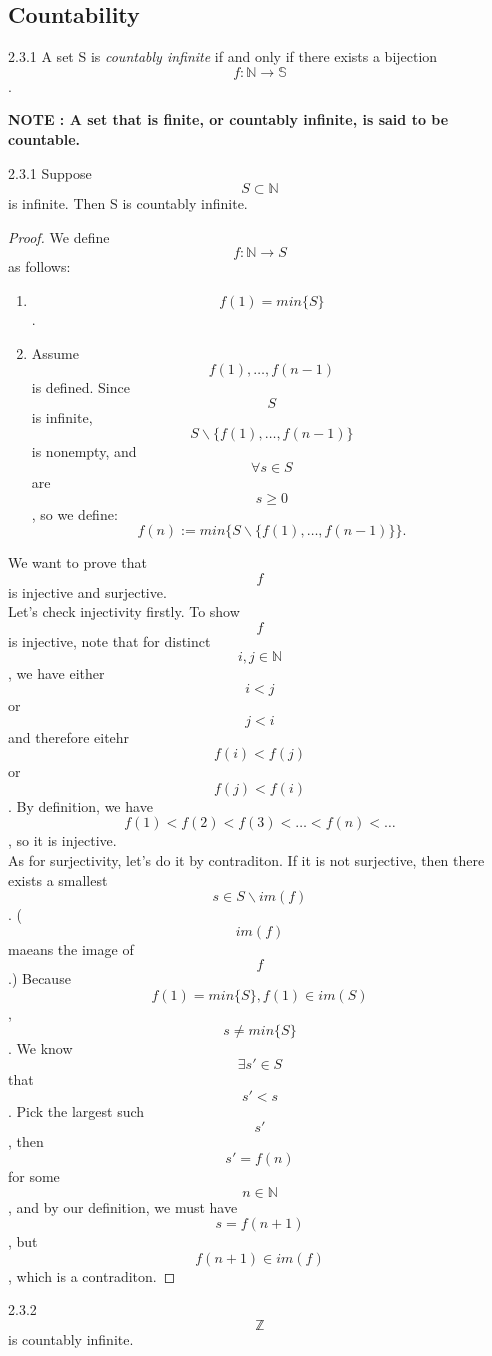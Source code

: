 \documentclass[a4paper]{article}
\begin{document}
\subsection{Countability}
\begin{definition}{2.3.1}{}
    A set S is \textit{countably infinite} if and only if there exists a bijection $$f:\mathbb{N}\rightarrow\mathbb{S}$$.
\end{definition}
\textbf{NOTE : A set that is finite, or countably infinite, is said to be countable.}
\begin{proposition}{2.3.1}{}
    Suppose $$S \subset \mathbb{N}$$ is infinite. Then S is countably infinite.
\end{proposition}
\begin{proof}We define $$f:\mathbb{N} \rightarrow S$$ as follows:\\
    \begin{enumerate}
        \item $$f(1)=min\{S\}$$.
        \item Assume $$f(1),\ldots,f(n-1)$$ is defined. Since $$S$$ is infinite, $$S \backslash  \{f(1),\ldots,f(n-1)\}$$ is nonempty, and $$\forall s \in S$$ are $$s \geq 0$$, so we define:
        \begin{equation*}
            f(n):=min\{S\backslash \{f(1),\ldots,f(n-1)\}\}.
        \end{equation*}
    \end{enumerate}
    We want to prove that $$f$$ is injective and surjective.\\
    Let's check injectivity firstly. To show $$f$$ is injective, note that for distinct $$i,j \in \mathbb{N}$$, we have either $$i<j$$ or $$j<i$$ and therefore eitehr $$f(i)<f(j)$$ or $$f(j)<f(i)$$. By definition, we have $$f(1)<f(2)<f(3)<\ldots<f(n)<\ldots$$, so it is injective. \\
    As for surjectivity, let's do it by contraditon. If it is not surjective, then there exists a smallest $$s\in S\backslash im(f)$$. ($$im(f)$$ maeans the image of $$f$$.) Because $$f(1)=min\{S\},f(1)\in im(S)$$, $$s\neq min\{S\}$$. We know $$\exists s' \in S$$ that $$s'<s$$. Pick the largest such $$s'$$, then $$s'=f(n)$$ for some $$n\in \mathbb{N}$$, and by our definition, we must have $$s=f(n+1)$$, but $$f(n+1)\in im(f)$$, which is a contraditon.
\end{proof}
\begin{proposition}{2.3.2}{}
    $$\mathbb{Z}$$ is countably infinite.
\end{proposition}
\end{document}
